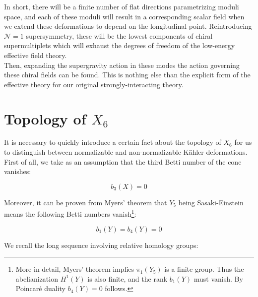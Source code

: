 In short, there will be a finite number of flat directions parametrizing moduli space, and each of these moduli will result in a corresponding scalar field when we extend these deformations to depend on the longitudinal point. Reintroducing $\mathcal{N}=1$ supersymmetry, these will be the lowest components of chiral supermultiplets which will exhaust the degrees of freedom of the low-energy effective field theory.\\

Then, expanding the supergravity action in these modes the action governing these chiral fields can be found. This is nothing else than the explicit form of the effective theory for our original strongly-interacting theory.

\section{Topology of $X_6$}

It is necessary to quickly introduce a certain fact about the topology of $X_6$ for us to distinguish between normalizable and non-normalizable K\"ahler deformations. First of all, we take as an assumption that the third Betti number of the cone vanishes:

\begin{equation}
	b_3(X) = 0 \label{bettiX3}
\end{equation}

Moreover, it can be proven \cite{sasakieinstein} from Myers' theorem \cite{myers1941} that $Y_5$ being Sasaki-Einstein means the following Betti numbers vanish\footnote{More in detail, Myers' theorem implies $\pi_1(Y_5)$ is a finite group. Thus the abelianization $H^1(Y)$ is also finite, and the rank $b_1(Y)$ must vanish. By Poincar\'e duality $b_4(Y)=0$ follows.}:

\begin{equation}
	b_1(Y) = b_4(Y) = 0 \label{bettiY14}
\end{equation}




We recall the long sequence involving relative homology groups:

